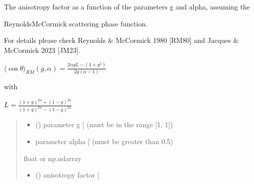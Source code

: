\documentclass[letterpaper,10pt,english]{sphinxmanual}
\begin{document}

\begin{fulllineitems}
\label{\detokenize{06_anisotropy_factor:skinoptics.anisotropy_factor.costheta_RM}}
\pysigstartsignatures
{}
\pysigstopsignatures
\begin{DUlineblock}{0em}
\item[] The anisotropy factor as a function of the parameters g and alpha, assuming the
\item[] Reynolds\sphinxhyphen{}McCormick scattering phase function.
\item[] For details please check Reynolds \& McCormick 1980 {[}RM80{]} and Jacques \& McCormick 2023 {[}JM23{]}.
\end{DUlineblock}

\begin{DUlineblock}{0em}
\item[] \(\langle \cos\theta \rangle_{RM}(g, \alpha) = \frac{2 \alpha g L - (1+g^2)}{2g(\alpha - 1)}\)
\item[] with
\item[] \(L = \frac{(1+g)^{2\alpha} + (1-g)^{2\alpha}}{(1+g)^{2\alpha} - (1-g)^{2\alpha}}\)
\end{DUlineblock}
\begin{quote}\begin{description}
\begin{itemize}
\item {} 
\sphinxAtStartPar
{} () \textendash{} parameter g {[}\sphinxhyphen{}{]} (must be in the range {[}\sphinxhyphen{}1, 1{]})

\item {} 
\sphinxAtStartPar
{} \textendash{} parameter alpha {[}\sphinxhyphen{}{]} (must be greater than \sphinxhyphen{}0.5)

\end{itemize}

\sphinxAtStartPar
float or np.ndarray

\sphinxAtStartPar
\begin{itemize}
\item {} 
\sphinxAtStartPar
{} () \textendash{} anisotropy factor {[}\sphinxhyphen{}{]}

\end{itemize}


\end{description}\end{quote}

\end{fulllineitems}
\end{document}
